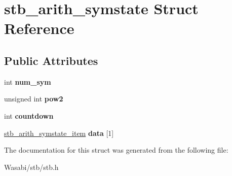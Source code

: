 \hypertarget{structstb__arith__symstate}{}\section{stb\+\_\+arith\+\_\+symstate Struct Reference}
\label{structstb__arith__symstate}
\subsection*{Public Attributes}
\begin{DoxyCompactItemize}
\item 
int {\bfseries num\+\_\+sym}\hypertarget{structstb__arith__symstate_ae4cdee63ead8655c41e27992ff305aac}{}\label{structstb__arith__symstate_ae4cdee63ead8655c41e27992ff305aac}

\item 
unsigned int {\bfseries pow2}\hypertarget{structstb__arith__symstate_a5d54ce9b3871b3b0defb2e7ffb5e9542}{}\label{structstb__arith__symstate_a5d54ce9b3871b3b0defb2e7ffb5e9542}

\item 
int {\bfseries countdown}\hypertarget{structstb__arith__symstate_ad7a85aeee41996a2d44a7cc42f96005f}{}\label{structstb__arith__symstate_ad7a85aeee41996a2d44a7cc42f96005f}

\item 
\hyperlink{structstb__arith__symstate__item}{stb\+\_\+arith\+\_\+symstate\+\_\+item} {\bfseries data} \mbox{[}1\mbox{]}\hypertarget{structstb__arith__symstate_a0568e4c385330503f5a5573ac2fb006b}{}\label{structstb__arith__symstate_a0568e4c385330503f5a5573ac2fb006b}

\end{DoxyCompactItemize}


The documentation for this struct was generated from the following file\+:\begin{DoxyCompactItemize}
\item 
Wasabi/stb/stb.\+h\end{DoxyCompactItemize}
